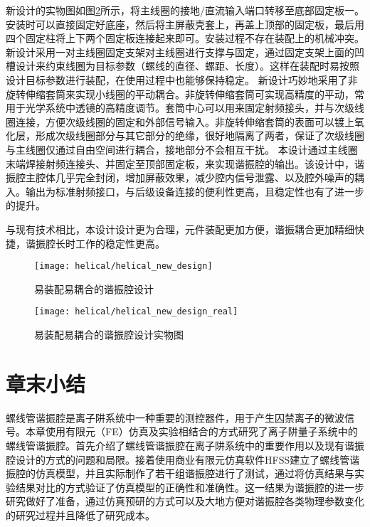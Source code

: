 新设计的实物图如图\ref{fig:helical_new_design_real}所示，将主线圈的接地/直流输入端口转移至底部固定板一。安装时可以直接固定好底座，然后将主屏蔽壳套上，再盖上顶部的固定板，最后用四个固定柱将上下两个固定板连接起来即可。安装过程不存在装配上的机械冲突。
新设计采用一对主线圈固定支架对主线圈进行支撑与固定，通过固定支架上面的凹槽设计来约束线圈为目标参数（螺线的直径、螺距、长度）。这样在装配时易按照设计目标参数进行装配，在使用过程中也能够保持稳定。
新设计巧妙地采用了非旋转伸缩套筒来实现小线圈的平动耦合。非旋转伸缩套筒可实现高精度的平动，常用于光学系统中透镜的高精度调节。套筒中心可以用来固定射频接头，并与次级线圈连接，方便次级线圈的固定和外部信号输入。非旋转伸缩套筒的表面可以镀上氧化层，形成次级线圈部分与其它部分的绝缘，很好地隔离了两者，保证了次级线圈与主线圈仅通过自由空间进行耦合，接地部分不会相互干扰。
本设计通过主线圈末端焊接射频连接头、并固定至顶部固定板，来实现谐振腔的输出。该设计中，谐振腔主腔体几乎完全封闭，增加屏蔽效果，减少腔内信号泄露、以及腔外噪声的耦入。输出为标准射频接口，与后级设备连接的便利性更高，且稳定性也有了进一步的提升。

与现有技术相比，本设计设计更为合理，元件装配更加方便，谐振耦合更加精细快捷，谐振腔长时工作的稳定性更高。
\begin{figure}
    \centering
    \caption[易装配易耦合的谐振腔设计]{易装配易耦合的谐振腔设计\label{fig:helical_new_design}}
    \texttt{[image: helical/helical\_new\_design]}
\end{figure}

\begin{figure}
    \centering
    \caption[易装配易耦合的谐振腔设计实物图]{易装配易耦合的谐振腔设计实物图\label{fig:helical_new_design_real}}
    \texttt{[image: helical/helical\_new\_design\_real]}
\end{figure}







\newpage
\section[章末小结]{章末小结}
螺线管谐振腔是离子阱系统中一种重要的测控器件，用于产生囚禁离子的微波信号。本章使用有限元（FE）仿真及实验相结合的方式研究了离子阱量子系统中的螺线管谐振腔。首先介绍了螺线管谐振腔在离子阱系统中的重要作用以及现有谐振腔设计的方式的问题和局限。接着使用商业有限元仿真软件HFSS建立了螺线管谐振腔的仿真模型，并且实际制作了若干组谐振腔进行了测试，通过将仿真结果与实验结果对比的方式验证了仿真模型的正确性和准确性。这一结果为谐振腔的进一步研究做好了准备，通过仿真预研的方式可以及大地方便对谐振腔各类物理参数变化的研究过程并且降低了研究成本。

